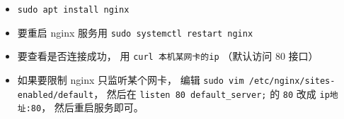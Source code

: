 
\begin{issues}
\issueDraft
\end{issues}

\begin{itemize}
\item \verb|sudo apt install nginx|
\item 要重启 nginx 服务用 \verb|sudo systemctl restart nginx|
\item 要查看是否连接成功， 用 \verb|curl 本机某网卡的ip| （默认访问 80 接口）
\item 如果要限制 nginx 只监听某个网卡， 编辑 \verb|sudo vim /etc/nginx/sites-enabled/default|， 然后在 \verb|listen 80 default_server;| 的 \verb|80| 改成 \verb|ip地址:80|， 然后重启服务即可。
\end{itemize}
